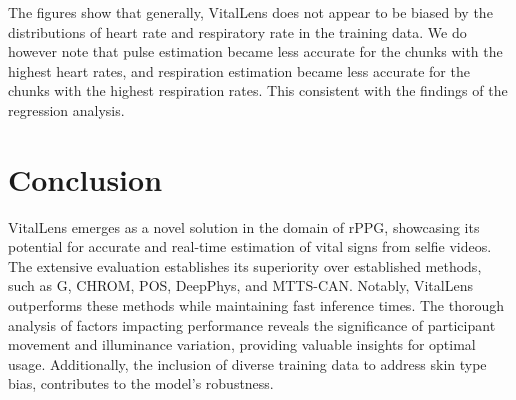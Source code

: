 \documentclass{article}
\begin{document}
The figures show that generally, VitalLens does not appear to be biased by the distributions of heart rate and respiratory rate in the training data.
We do however note that pulse estimation became less accurate for the chunks with the highest heart rates, and respiration estimation became less accurate for the chunks with the highest respiration rates.
This consistent with the findings of the regression analysis.

\section{Conclusion}
\label{sec:conclusion}

VitalLens emerges as a novel solution in the domain of rPPG, showcasing its potential for accurate and real-time estimation of vital signs from selfie videos.
The extensive evaluation establishes its superiority over established methods, such as G, CHROM, POS, DeepPhys, and MTTS-CAN.
Notably, VitalLens outperforms these methods while maintaining fast inference times.
The thorough analysis of factors impacting performance reveals the significance of participant movement and illuminance variation, providing valuable insights for optimal usage.
Additionally, the inclusion of diverse training data to address skin type bias, contributes to the model's robustness.




\end{document}
